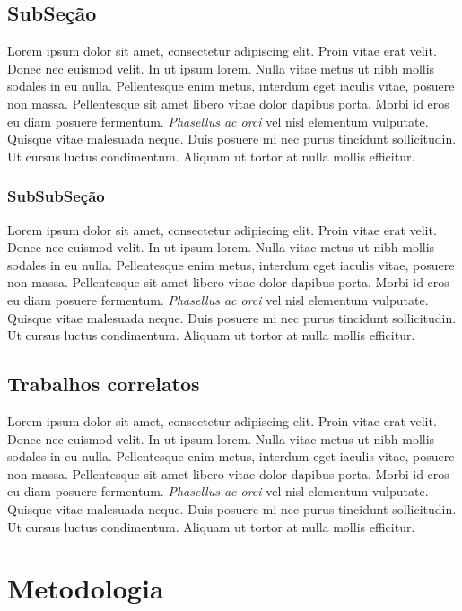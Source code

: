\documentclass[10pt, conference, compsocconf]{IEEEtran}
\begin{document}
\subsection{SubSeção}

Lorem ipsum dolor sit amet, consectetur adipiscing elit. Proin vitae erat velit. Donec nec euismod velit. In ut ipsum lorem. Nulla vitae metus ut nibh mollis sodales in eu nulla. Pellentesque enim metus, interdum eget iaculis vitae, posuere non massa. Pellentesque sit amet libero vitae dolor dapibus porta. Morbi id eros eu diam posuere fermentum. \textit{Phasellus ac orci} vel nisl elementum vulputate. Quisque vitae malesuada neque. Duis posuere mi nec purus tincidunt sollicitudin. Ut cursus luctus condimentum. Aliquam ut tortor at nulla mollis efficitur.


\subsubsection{SubSubSeção} Lorem ipsum dolor sit amet, consectetur adipiscing elit. Proin vitae erat velit. Donec nec euismod velit. In ut ipsum lorem. Nulla vitae metus ut nibh mollis sodales in eu nulla. Pellentesque enim metus, interdum eget iaculis vitae, posuere non massa. Pellentesque sit amet libero vitae dolor dapibus porta. Morbi id eros eu diam posuere fermentum. \textit{Phasellus ac orci} vel nisl elementum vulputate. Quisque vitae malesuada neque. Duis posuere mi nec purus tincidunt sollicitudin. Ut cursus luctus condimentum. Aliquam ut tortor at nulla mollis efficitur.


\subsection{Trabalhos correlatos}

Lorem ipsum dolor sit amet, consectetur adipiscing elit. Proin vitae erat velit. Donec nec euismod velit. In ut ipsum lorem. Nulla vitae metus ut nibh mollis sodales in eu nulla. Pellentesque enim metus, interdum eget iaculis vitae, posuere non massa. Pellentesque sit amet libero vitae dolor dapibus porta. Morbi id eros eu diam posuere fermentum. \textit{Phasellus ac orci} vel nisl elementum vulputate. Quisque vitae malesuada neque. Duis posuere mi nec purus tincidunt sollicitudin. Ut cursus luctus condimentum. Aliquam ut tortor at nulla mollis efficitur.


\section{Metodologia}
\end{document}
